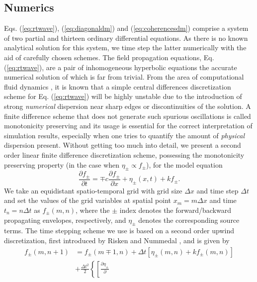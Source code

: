 \documentclass[10pt]{article}
\begin{document}
\begin{appendices}%
\section{Numerics}
\label{sec:numerics}
Eqs. (\ref{eq:rtwave}), (\ref{eq:diagonaldm}) and
(\ref{eq:coherencesdm}) comprise a system of two partial and thirteen ordinary
differential equations. As there is no known analytical solution for this
system, we time step the latter numerically with the aid of carefully chosen
schemes. The field propagation equations, Eq. (\ref{eq:rtwave}), are a pair of
inhomogeneous hyperbolic equations the accurate numerical solution of which is
far from trivial. From the area of computational fluid dynamics
\cite{wesseling2009principles}, it is known that a simple central differences
discretization scheme for Eq. (\ref{eq:rtwave}) will be highly unstable due to
the introduction of strong \emph{numerical} dispersion near sharp edges or
discontinuities of the solution. A finite difference scheme that does not
generate such spurious oscillations is called monotonicity preserving
\cite{wesseling2009principles} and its usage is essential for the correct
interpretation of simulation results, especially when one tries to quantify
the amount of \emph{physical} dispersion present. Without getting too much
into detail, we present a second order linear finite difference discretization
scheme, possessing the monotonicity preserving property (in the case when
$\eta_{\pm}\propto f_{\pm}$), for the model equation
\begin{equation}
	\frac{\partial f_{\pm}}{\partial t}=\mp c\frac{\partial f_{\pm}}{\partial
		x}+\eta_{\pm}(x,t)+kf_{\pm}.\label{eq:genericwave}%
\end{equation}
We take an equidistant spatio-temporal grid with grid size $\Delta x$ and time
step $\Delta t$ and set the values of the grid variables at spatial point
$x_{m}=m\Delta x$ and time $t_{n}=n\Delta t$ as $f_{\pm}(m,n)$, where the
$\pm$ index denotes the forward/backward propagating envelopes, respectively, and $\eta_{\pm}$ denotes the corresponding source terms. The time stepping scheme we use is based on a second order upwind
discretization, first introduced by Risken and Nummedal \cite{risken1968self},
and is given by
\begin{align}
	f_{\pm}(m,n+1) &  =f_{\pm}(m\mp1,n)+\Delta t\left[  \eta_{\pm}(m,n)+kf_{\pm
	}(m,n)\right]  \nonumber\label{eq:riskennummedal}\\
	&  +\frac{\Delta t^{2}}{2}\left\{  \left[  \frac{\partial \eta_{\pm}}{\partial
}
\end{align}
\end{appendices}
\end{document}
